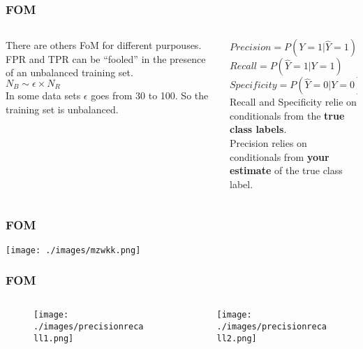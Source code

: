\documentclass[10pt]{beamer}
\begin{document}
\begin{frame} \frametitle{FOM}
\begin{columns}
 \begin{column}{0.45\textwidth}
 There are others FoM for different purpouses.
 FPR and TPR can be ``fooled'' in the presence of an unbalanced
 training set.\\
 $N_B \sim \epsilon\times N_R$ \\
 In some data sets $\epsilon$ goes from 30 to 100.
 So the training set is unbalanced.\\
 \end{column}
 \begin{column}{0.5\textwidth}
$Precision = P(Y=1|\hat{Y} = 1)$ \\
$Recall = P(\hat{Y} = 1 | Y=1)$ \\
$Specificity = P(\hat{Y} = 0 | Y=0)$ \\
\bigskip
 Recall and Specificity relie on conditionals from 
 the \textbf{true class labels}. \\
 Precision relies on conditionals from 
 \textbf{your estimate} of the true class label.
\end{column}

 \end{columns}
\end{frame}
\begin{frame} \frametitle{FOM}
\begin{center}
 \texttt{[image: ./images/mzwkk.png]}
\end{center}
\end{frame}
\begin{frame} \frametitle{FOM}
\begin{columns}
\begin{column}{0.5\textwidth}
 \begin{figure}
 \centering
 \texttt{[image: ./images/precisionrecall1.png]}
\end{figure}
\end{column}
\begin{column}{0.5\textwidth}
 \begin{figure}
 \centering
 \texttt{[image: ./images/precisionrecall2.png]}
\end{figure}
\end{column}
\end{columns}
\end{frame}
\end{document}

